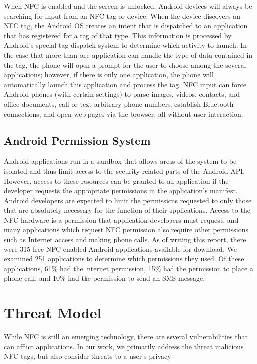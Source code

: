 \documentclass[12pt]{article}
\begin{document}
When NFC is enabled and the screen is unlocked, Android devices will always be searching for input from an NFC tag or device. 
When the device discovers an NFC tag, the Android OS creates an intent that is dispatched to an application that has registered for a tag of that type.
This information is processed by Android's special tag dispatch system to determine which activity to launch.
In the case that more than one application can handle the type of data contained in the tag, the phone will open a prompt for the user to choose among the several applications; however, if there is only one application, the phone will automatically launch this application and process the tag.
NFC input can force Android phones (with certain settings) to parse images, videos, contacts, and office documents, call or text arbitrary phone numbers, establish Bluetooth connections, and open web pages via the browser, all without user interaction.  

\subsection{Android Permission System}
Android applications run in a sandbox that allows areas of the system to be isolated and thus limit access to the security-related parts of the Android API.
However, access to these resources can be granted to an application if the developer requests the appropriate permissions in the application's manifest.
Android developers are expected to limit the permissions requested to only those that are absolutely necessary for the function of their applications.
Access to the NFC hardware is a permission that application developers must request, and many applications which request NFC permission also require other permissions such as Internet access and making phone calls.
As of writing this report, there were 315 free NFC-enabled Android applications available for download.
We examined 251 applications to determine which permissions they used.
Of these applications, 61\% had the internet permission, 15\% had the permission to place a phone call, and 10\% had the permission to send an SMS message.

\section{Threat Model}
While NFC is still an emerging technology, there are several vulnerabilities that can afflict applications.
In our work, we primarily address the threat malicious NFC tags, but also consider threats to a user's privacy. 
\end{document}
